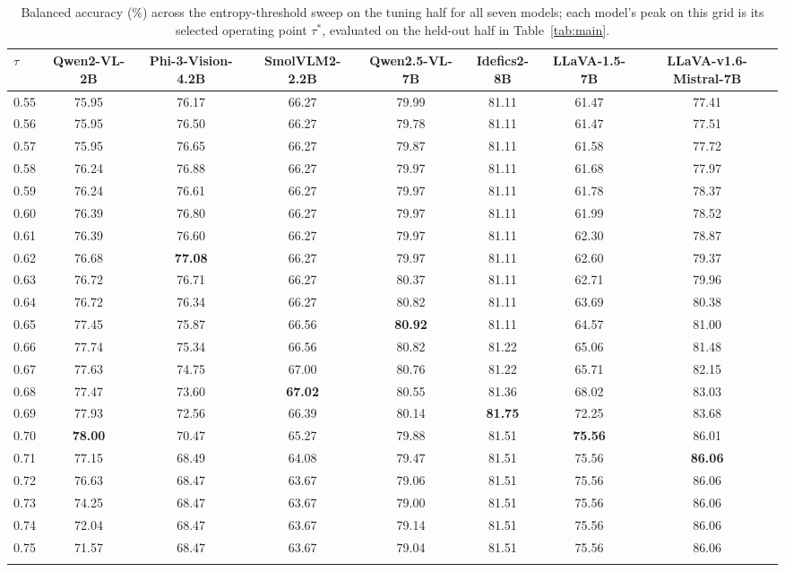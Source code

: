 \documentclass[pdflatex,sn-basic,Numbered]{sn-jnl}
\theoremstyle{thmstyleone}
\theoremstyle{thmstyletwo}
\theoremstyle{thmstylethree}
\begin{document}
\begin{appendices}
\begin{table}
\caption{Balanced accuracy (\%) across the entropy-threshold sweep on the tuning half for all seven models; each model's peak on this grid is its selected operating point $\tau^{*}$, evaluated on the held-out half in Table~\ref{tab:main}.}\label{tab:sweep}
\begin{tabular*}{\textheight}{@{\extracolsep\fill}lccccccc@{}}
\toprule
$\tau$ & \textbf{Qwen2-VL-2B} & \textbf{Phi-3-Vision-4.2B} & \textbf{SmolVLM2-2.2B} & \textbf{Qwen2.5-VL-7B} & \textbf{Idefics2-8B} & \textbf{LLaVA-1.5-7B} & \textbf{LLaVA-v1.6-Mistral-7B}\\
\midrule
0.55 & 75.95 & 76.17 & 66.27 & 79.99 & 81.11 & 61.47 & 77.41 \\
0.56 & 75.95 & 76.50 & 66.27 & 79.78 & 81.11 & 61.47 & 77.51 \\
0.57 & 75.95 & 76.65 & 66.27 & 79.87 & 81.11 & 61.58 & 77.72 \\
0.58 & 76.24 & 76.88 & 66.27 & 79.97 & 81.11 & 61.68 & 77.97 \\
0.59 & 76.24 & 76.61 & 66.27 & 79.97 & 81.11 & 61.78 & 78.37 \\
0.60 & 76.39 & 76.80 & 66.27 & 79.97 & 81.11 & 61.99 & 78.52 \\
0.61 & 76.39 & 76.60 & 66.27 & 79.97 & 81.11 & 62.30 & 78.87 \\
0.62 & 76.68 & \textbf{77.08} & 66.27 & 79.97 & 81.11 & 62.60 & 79.37 \\
0.63 & 76.72 & 76.71 & 66.27 & 80.37 & 81.11 & 62.71 & 79.96 \\
0.64 & 76.72 & 76.34 & 66.27 & 80.82 & 81.11 & 63.69 & 80.38 \\
0.65 & 77.45 & 75.87 & 66.56 & \textbf{80.92} & 81.11 & 64.57 & 81.00 \\
0.66 & 77.74 & 75.34 & 66.56 & 80.82 & 81.22 & 65.06 & 81.48 \\
0.67 & 77.63 & 74.75 & 67.00 & 80.76 & 81.22 & 65.71 & 82.15 \\
0.68 & 77.47 & 73.60 & \textbf{67.02} & 80.55 & 81.36 & 68.02 & 83.03 \\
0.69 & 77.93 & 72.56 & 66.39 & 80.14 & \textbf{81.75} & 72.25 & 83.68 \\
0.70 & \textbf{78.00} & 70.47 & 65.27 & 79.88 & 81.51 & \textbf{75.56} & 86.01 \\
0.71 & 77.15 & 68.49 & 64.08 & 79.47 & 81.51 & 75.56 & \textbf{86.06} \\
0.72 & 76.63 & 68.47 & 63.67 & 79.06 & 81.51 & 75.56 & 86.06 \\
0.73 & 74.25 & 68.47 & 63.67 & 79.00 & 81.51 & 75.56 & 86.06 \\
0.74 & 72.04 & 68.47 & 63.67 & 79.14 & 81.51 & 75.56 & 86.06 \\
0.75 & 71.57 & 68.47 & 63.67 & 79.04 & 81.51 & 75.56 & 86.06 \\
\botrule
\end{tabular*}
\end{table}


\end{appendices}
\end{document}
